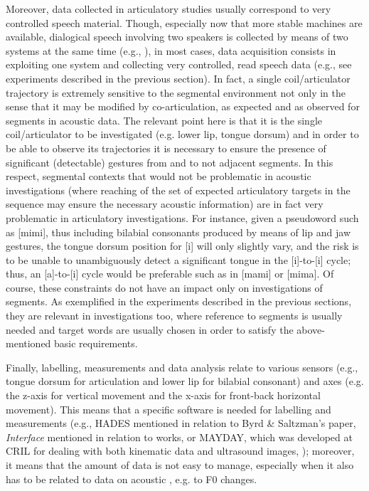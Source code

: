 \documentclass[output=paper]{langsci/langscibook}
\begin{document}
Moreover, data collected in articulatory studies usually correspond to very controlled speech material. Though, especially now that more stable machines are available, dialogical speech involving two speakers is collected by means of two systems at the same time (e.g., \citealt{Geng2013}), in most cases, data acquisition consists in exploiting one system and collecting very controlled, read speech data (e.g., see experiments described in the previous section). In fact, a single coil\slash articulator trajectory is extremely sensitive to the segmental environment not only in the sense that it may be modified by co-articulation, as expected and as observed for segments in acoustic data. The relevant point here is that it is the single coil\slash articulator to be investigated (e.g. lower lip, tongue dorsum) and in order to be able to observe its trajectories it is necessary to ensure the presence of significant (detectable) gestures from and to not adjacent segments. In this respect, segmental contexts that would not be problematic in acoustic investigations (where reaching of the set of expected articulatory targets in the sequence may ensure the necessary acoustic information) are in fact very problematic in articulatory investigations. For instance, given a pseudoword such as [mimi], thus including bilabial consonants produced by means of lip and jaw gestures, the tongue dorsum position for [i] will only slightly vary, and the risk is to be unable to unambiguously detect a significant tongue  in the [i]-to-[i] cycle; thus, an [a]-to-[i] cycle would be preferable such as in [mami] or [mima]. Of course, these constraints do not have an impact only on investigations of segments. As exemplified in the experiments described in the previous sections, they are relevant in  investigations too, where reference to segments is usually needed and target words are usually chosen in order to satisfy the above-mentioned basic requirements.

Finally, labelling, measurements and data analysis relate to various sensors (e.g., tongue dorsum for  articulation and lower lip for bilabial consonant) and axes (e.g. the z-axis for vertical movement and the x-axis for front-back horizontal movement). This means that a specific software is needed for labelling and measurements (e.g., HADES mentioned in relation to Byrd \& Saltzman’s \citeyear{Byrd1998} paper, \textit{Interface} mentioned in relation to \citealt{Avesani2007,Avesani2009} works, or MAYDAY, which was developed at CRIL for dealing with both kinematic data and ultrasound images, \citealt{Sigona2015}); moreover, it means that the amount of data is not easy to manage, especially when it also has to be related to data on acoustic , e.g. to F0 changes.
\end{document}
